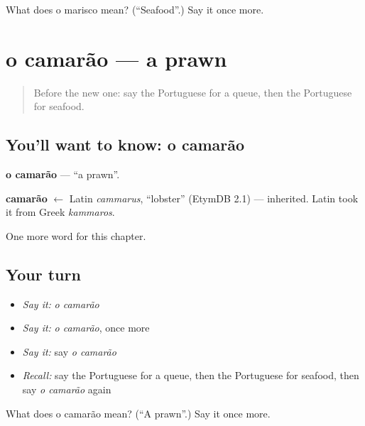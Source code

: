 \begin{tcolorbox}[breakable,colback=teal!4,colframe=teal!35!black,title={Before you move on}]
What does o marisco mean? (\textquotedblleft{}Seafood\textquotedblright{}.) Say it once more.
\end{tcolorbox}
\section[o camarão]{o camarão — a prawn}

\label{lesson:PT-C254-camarao}



\begin{quote}
Before the new one: say the Portuguese for a queue, then the Portuguese for seafood.
\end{quote}

\subsection*{You'll want to know: o camarão}
\textbf{o camarão} — \textquotedblleft{}a prawn\textquotedblright{}.

\begin{cousinweb}
\textbf{camarão} $\leftarrow$ Latin \emph{cammarus}, \textquotedblleft{}lobster\textquotedblright{} (EtymDB 2.1) — inherited. Latin took it from Greek \emph{kammaros}.
\end{cousinweb}

\begin{grammarlens}[title={What you've built}]
One more word for this chapter.
\end{grammarlens}

\subsection*{Your turn}
\begin{itemize}
\raggedright
  \item \emph{Say it:} \emph{o camarão}
  \item \emph{Say it:} \emph{o camarão}, once more
  \item \emph{Say it:} say \emph{o camarão}
  \item \emph{Recall:} say the Portuguese for a queue, then the Portuguese for seafood, then say \emph{o camarão} again
\end{itemize}

\begin{tcolorbox}[breakable,colback=teal!4,colframe=teal!35!black,title={Before you move on}]
What does o camarão mean? (\textquotedblleft{}A prawn\textquotedblright{}.) Say it once more.
\end{tcolorbox}
